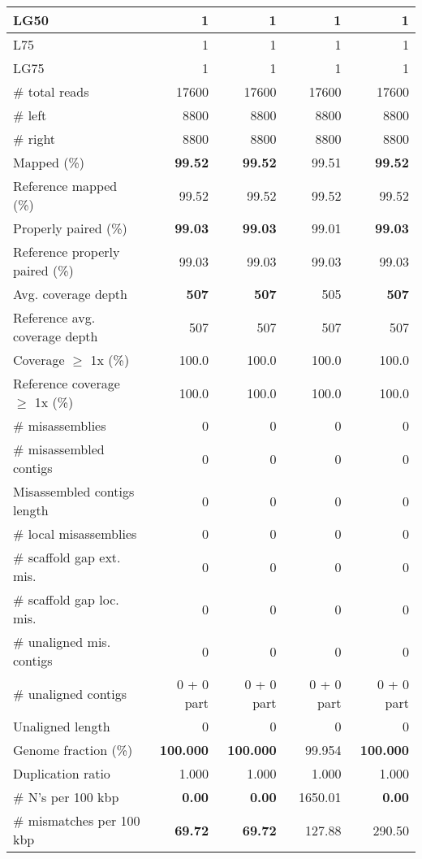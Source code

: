 \documentclass[12pt,a4paper]{article}
\begin{document}
\begin{table}[ht]
\begin{center}
\begin{tabular}{|l*{4}{|r}|}
LG50 & 1 & 1 & 1 & 1 \\ \hline
L75 & 1 & 1 & 1 & 1 \\ \hline
LG75 & 1 & 1 & 1 & 1 \\ \hline
\# total reads & 17600 & 17600 & 17600 & 17600 \\ \hline
\# left & 8800 & 8800 & 8800 & 8800 \\ \hline
\# right & 8800 & 8800 & 8800 & 8800 \\ \hline
Mapped (\%) & {\bf 99.52} & {\bf 99.52} & 99.51 & {\bf 99.52} \\ \hline
Reference mapped (\%) & 99.52 & 99.52 & 99.52 & 99.52 \\ \hline
Properly paired (\%) & {\bf 99.03} & {\bf 99.03} & 99.01 & {\bf 99.03} \\ \hline
Reference properly paired (\%) & 99.03 & 99.03 & 99.03 & 99.03 \\ \hline
Avg. coverage depth & {\bf 507} & {\bf 507} & 505 & {\bf 507} \\ \hline
Reference avg. coverage depth & 507 & 507 & 507 & 507 \\ \hline
Coverage $\geq$ 1x (\%) & 100.0 & 100.0 & 100.0 & 100.0 \\ \hline
Reference coverage $\geq$ 1x (\%) & 100.0 & 100.0 & 100.0 & 100.0 \\ \hline
\# misassemblies & 0 & 0 & 0 & 0 \\ \hline
\# misassembled contigs & 0 & 0 & 0 & 0 \\ \hline
Misassembled contigs length & 0 & 0 & 0 & 0 \\ \hline
\# local misassemblies & 0 & 0 & 0 & 0 \\ \hline
\# scaffold gap ext. mis. & 0 & 0 & 0 & 0 \\ \hline
\# scaffold gap loc. mis. & 0 & 0 & 0 & 0 \\ \hline
\# unaligned mis. contigs & 0 & 0 & 0 & 0 \\ \hline
\# unaligned contigs & 0 + 0 part & 0 + 0 part & 0 + 0 part & 0 + 0 part \\ \hline
Unaligned length & 0 & 0 & 0 & 0 \\ \hline
Genome fraction (\%) & {\bf 100.000} & {\bf 100.000} & 99.954 & {\bf 100.000} \\ \hline
Duplication ratio & 1.000 & 1.000 & 1.000 & 1.000 \\ \hline
\# N's per 100 kbp & {\bf 0.00} & {\bf 0.00} & 1650.01 & {\bf 0.00} \\ \hline
\# mismatches per 100 kbp & {\bf 69.72} & {\bf 69.72} & 127.88 & 290.50 \\ \hline

\end{tabular}
\end{center}
\end{table}
\end{document}
